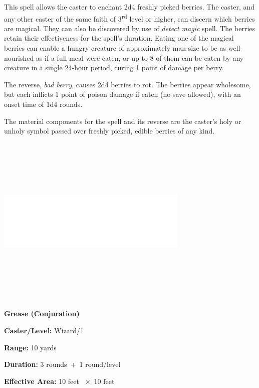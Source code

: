 \begin{multicols}{2}
This spell allows the caster to enchant 2d4 freshly picked berries.  The caster, and any other caster of the same faith of 3\textsuperscript{rd} level or higher, can discern which berries are magical.  They can also be discovered by use of \textit{detect magic} spell.  The berries retain their effectiveness for the spell's duration.  Eating one of the magical berries can enable a hungry creature of approximately man-size to be as well-nourished as if a full meal were eaten, or up to 8 of them can be eaten by any creature in a single 24-hour period, curing 1 point of damage per berry.

The reverse, \textit{bad berry}, causes 2d4 berries to rot.  The berries appear wholesome, but each inflicts 1 point of poison damage if eaten (no save allowed), with an onset time of 1d4 rounds.

The material components for the spell and its reverse are the caster's holy or unholy symbol passed over freshly picked, edible berries of any kind.

\noindent\includegraphics[width=3.6in, height=3.25in]{testblock.pdf}

\vspace{1em}

\noindent
\begin{minipage}{\columnwidth}

\noindent \textbf{Grease (Conjuration)}

\noindent \textbf{Caster/Level:} Wizard/1

\noindent \textbf{Range:} 10 yards

\noindent \textbf{Duration:} 3 rounds~+~1 round/level

\noindent \textbf{Effective Area:} 10 feet ~$\times$~10 feet


\end{minipage}
\end{multicols}
